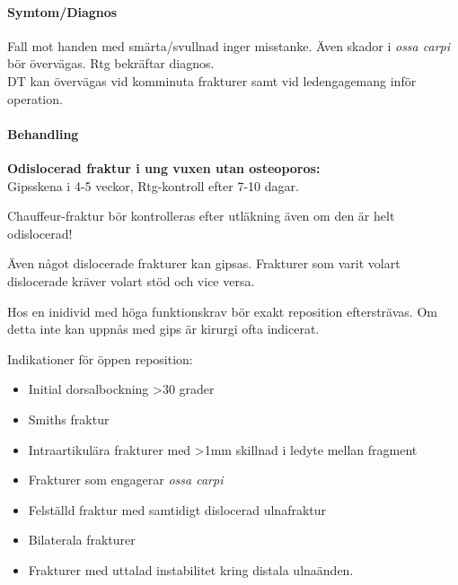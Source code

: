 \documentclass[
  letterpaper,
  DIV=11,
  numbers=noendperiod]{scrreport}
\let\oldparagraph\paragraph
\renewcommand{\paragraph}[1]{\oldparagraph{#1}\mbox{}}
\providecommand{\tightlist}{%
  \setlength{\itemsep}{0pt}\setlength{\parskip}{0pt}}\usepackage{longtable,booktabs,array}
\begin{document}
\hypertarget{symtomdiagnos}{%
\paragraph{Symtom/Diagnos}\label{symtomdiagnos}}

Fall mot handen med smärta/svullnad inger misstanke. Även skador i
\emph{ossa carpi} bör övervägas. Rtg bekräftar diagnos.\\
DT kan övervägas vid komminuta frakturer samt vid ledengagemang inför
operation.

\hypertarget{behandling-6}{%
\paragraph{Behandling}\label{behandling-6}}

\textbf{Odislocerad fraktur i ung vuxen utan osteoporos:}\\
Gipsskena i 4-5 veckor, Rtg-kontroll efter 7-10 dagar.

\begin{tcolorbox}[enhanced jigsaw, colback=white, colbacktitle=quarto-callout-warning-color!10!white, toptitle=1mm, arc=.35mm, toprule=.15mm, rightrule=.15mm, titlerule=0mm, breakable, bottomrule=.15mm, colframe=quarto-callout-warning-color-frame, left=2mm, opacityback=0, coltitle=black, title=\textcolor{quarto-callout-warning-color}{\faExclamationTriangle}\hspace{0.5em}{Varning}, leftrule=.75mm, bottomtitle=1mm, opacitybacktitle=0.6]

Chauffeur-fraktur bör kontrolleras efter utläkning även om den är helt
odislocerad!

\end{tcolorbox}

Även något dislocerade frakturer kan gipsas. Frakturer som varit volart
dislocerade kräver volart stöd och vice versa.

Hos en inidivid med höga funktionskrav bör exakt reposition
eftersträvas. Om detta inte kan uppnås med gips är kirurgi ofta
indicerat.

Indikationer för öppen reposition:

\begin{itemize}
\tightlist
\item
  Initial dorsalbockning \textgreater30 grader
\item
  Smiths fraktur
\item
  Intraartikulära frakturer med \textgreater1mm skillnad i ledyte mellan
  fragment
\item
  Frakturer som engagerar \emph{ossa carpi}
\item
  Felställd fraktur med samtidigt dislocerad ulnafraktur
\item
  Bilaterala frakturer
\item
  Frakturer med uttalad instabilitet kring distala ulnaänden.
\end{itemize}
\end{document}
